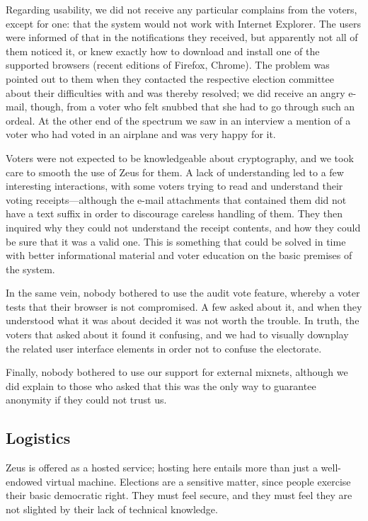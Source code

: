 \documentclass[letterpaper,10pt]{article}
\begin{document}
Regarding usability, we did not receive any particular complains from
the voters, except for one: that the system would not work with
Internet Explorer. The users were informed of that in the
notifications they received, but apparently not all of them noticed
it, or knew exactly how to download and install one of the supported
browsers (recent editions of Firefox, Chrome). The problem was pointed
out to them when they contacted the respective election committee
about their difficulties with and was thereby resolved; we did receive
an angry e-mail, though, from a voter who felt snubbed that she had
to go through such an ordeal. At the other end of the spectrum we saw
in an interview a mention of a voter who had voted in an airplane and
was very happy for it.

Voters were not expected to be knowledgeable about cryptography, and
we took care to smooth the use of Zeus for them. A lack of
understanding led to a few interesting interactions, with some voters
trying to read and understand their voting receipts---although the
e-mail attachments that contained them did not have a text suffix in
order to discourage careless handling of them. They then inquired why
they could not understand the receipt contents, and how they could be
sure that it was a valid one. This is something that could be solved
in time with better informational material and voter education on the
basic premises of the system.

In the same vein, nobody bothered to use the audit vote feature,
whereby a voter tests that their browser is not compromised. A few
asked about it, and when they understood what it was about decided it
was not worth the trouble. In truth, the voters that asked about it
found it confusing, and we had to visually downplay the related user
interface elements in order not to confuse the electorate.

Finally, nobody bothered to use our support for external mixnets,
although we did explain to those who asked that this was the only way
to guarantee anonymity if they could not trust us.

\subsection{Logistics}
\label{ssec:logistics}

Zeus is offered as a hosted service; hosting here entails more than
just a well-endowed virtual machine. Elections are a sensitive matter,
since people exercise their basic democratic right. They must feel
secure, and they must feel they are not slighted by their lack of
technical knowledge.
\end{document}
